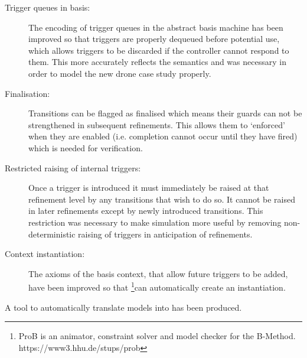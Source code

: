 \begin{description}
\item[Trigger queues in basis:]
  \begin{sloppypar}
    The encoding of trigger queues in the abstract basis machine has been improved so that triggers are properly dequeued before potential use,
    which allows triggers to be discarded if the controller cannot respond to them.
    This more accurately reflects the \SCXML semantics and was necessary in order to model the new drone case study properly.
  \end{sloppypar}

\item[Finalisation:] Transitions can be flagged as finalised which means their guards can not be strengthened in subsequent refinements. This allows them to `enforced' when they are enabled (i.e. completion cannot occur until they have fired) which is needed for verification.

\item[Restricted raising of internal triggers:] Once a trigger is introduced it must immediately be raised at that refinement level by any transitions that wish to do so. It cannot be raised in later refinements except by newly introduced transitions. This restriction was necessary to make simulation more useful by removing non-deterministic raising of triggers in anticipation of refinements.

\item[Context instantiation:] The axioms of the basis context, that allow future triggers to be added, have been improved so that \PROB\footnote{ProB is an animator, constraint solver and model checker for the B-Method. https://www3.hhu.de/stups/prob}can automatically create an instantiation.

\end{description}

A tool to automatically translate \SCXML models into \UMLB has been produced.

